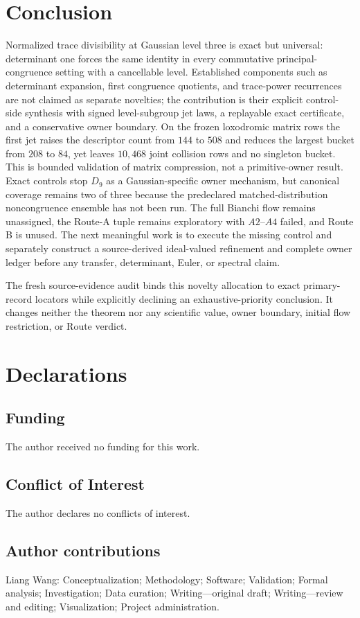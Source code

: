 \documentclass[11pt,a4paper]{article}
\theoremstyle{definition}
\theoremstyle{remark}
\begin{document}
\section{Conclusion}

Normalized trace divisibility at Gaussian level three is exact but universal: determinant one forces the same identity in every commutative principal-congruence setting with a cancellable level. Established components such as determinant expansion, first congruence quotients, and trace-power recurrences are not claimed as separate novelties; the contribution is their explicit control-side synthesis with signed level-subgroup jet laws, a replayable exact certificate, and a conservative owner boundary. On the frozen loxodromic matrix rows the first jet raises the descriptor count from \(144\) to \(508\) and reduces the largest bucket from \(208\) to \(84\), yet leaves \(10{,}468\) joint collision rows and no singleton bucket. This is bounded validation of matrix compression, not a primitive-owner result. Exact controls stop \(D_9\) as a Gaussian-specific owner mechanism, but canonical coverage remains two of three because the predeclared matched-distribution noncongruence ensemble has not been run. The full Bianchi flow remains unassigned, the Route-A tuple remains exploratory with \(A2\)--\(A4\) failed, and Route B is unused. The next meaningful work is to execute the missing control and separately construct a source-derived ideal-valued refinement and complete owner ledger before any transfer, determinant, Euler, or spectral claim.

The fresh source-evidence audit binds this novelty allocation to exact primary-record locators while explicitly declining an exhaustive-priority conclusion. It changes neither the theorem nor any scientific value, owner boundary, initial flow restriction, or Route verdict.

\section*{Declarations}
\subsection*{Funding}
The author received no funding for this work.
\subsection*{Conflict of Interest}
The author declares no conflicts of interest.
\subsection*{Author contributions}
Liang Wang: Conceptualization; Methodology; Software; Validation; Formal analysis; Investigation; Data curation; Writing---original draft; Writing---review and editing; Visualization; Project administration.
\end{document}
